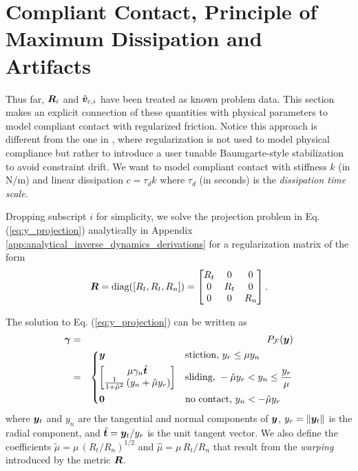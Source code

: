\section{Compliant Contact, Principle of Maximum Dissipation and Artifacts}
\label{sec:physical_intuition}

Thus far, ${\bm{R}}_i$ and $\hat{{\bm{v}}}_{c,i}$ have been treated as known problem
data. This section makes an explicit connection of these quantities with
physical parameters to model compliant contact with regularized friction. Notice
this approach is different from the one in \cite{bib:todorov2014}, where
regularization is not used to model physical compliance but rather to introduce
a user tunable Baumgarte-style stabilization to avoid constraint drift. We want
to model compliant contact with stiffness $k$ (in N/m) and linear
dissipation $c = \tau_d k$ where $\tau_d$ (in seconds) is the \textit{dissipation
time scale}. 

Dropping subscript $i$ for simplicity, we solve the projection problem in Eq.
(\ref{eq:y_projection}) analytically in Appendix
\ref{app:analytical_inverse_dynamics_derivations} for a regularization matrix of
the form
\begin{align*}	
	{\bm{R}} = \text{diag}([R_t, R_t, R_n]) = 
	\begin{bmatrix}
		R_t &   0 & 0\\
		  0 & R_t & 0\\
		  0 &   0 & R_n
	\end{bmatrix}.
\end{align*} 

The solution to  Eq. (\ref{eq:y_projection}) can be written as
\begin{eqnarray}
	\bgamma &=& P_\mathcal{F}(\vf{y})
    \label{eq:analytical_y_projection}\\
    &=&\begin{dcases}
	\vf{y} 
	& \text{stiction, } y_r \le \mu y_n\\
	\begin{bmatrix}
		\mu\gamma_n\hat{\vf{t}}\\
		\frac{1}{1+\tilde\mu^2}\left(y_n +
        \hat\mu y_r\right)
	\end{bmatrix}
	& \text{sliding, } -\hat\mu y_r < y_n \leq \frac{y_r}{\mu}\\
    \vf{0} & \text{no contact, } y_n < -\hat\mu y_r
\end{dcases}\nonumber	
\end{eqnarray}
where ${\bm{y}}_t$ and $y_n$ are the tangential and normal components of ${\bm{y}}$,
$y_r=\Vert{\bm{y}}_t\Vert$ is the radial component, and $\hat{{\bm{t}}}={\bm{y}}_t/y_r$
is the unit tangent vector. We also define the coefficients
$\tilde\mu=\mu\,(R_t/R_n)^{1/2}$ and $\hat\mu=\mu\,R_t/R_n$ that
result from the \textit{warping} introduced by the metric ${\bm{R}}$.

